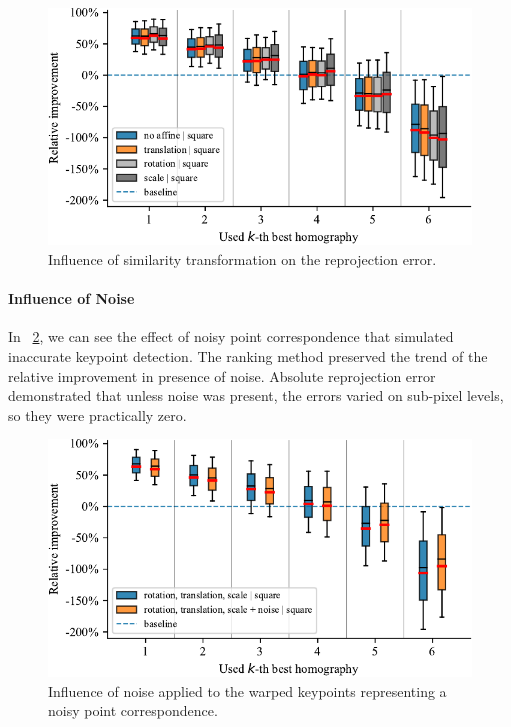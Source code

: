 \begin{figure}[t]
    \centering
    \includegraphics[width=\boxplotimgwidth]{figures/homography/similarity_transform_influence.pdf}
    \caption{Influence of similarity transformation on the reprojection error.}
    \label{fig:SimilarityTransformInfluence}
\end{figure}

\paragraph{Influence of Noise}
In \figstr{}~\ref{fig:NoiseInfluence}, we can see the effect of noisy point correspondence that simulated inaccurate keypoint detection. The ranking method preserved the trend of the relative improvement in presence of noise. Absolute reprojection error demonstrated that unless noise was present, the errors varied on sub-pixel levels, so they were practically zero.

\begin{figure}[t]
    \centering
    \includegraphics[width=\boxplotimgwidth]{figures/homography/noise_influence.pdf}
    \caption{Influence of noise applied to the warped keypoints representing a noisy point correspondence.}
    \label{fig:NoiseInfluence}
\end{figure}


